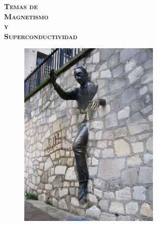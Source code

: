 \documentclass[
11pt, %
spanish,
singlespacing, %
parskip, %
headsepline, %
]{MastersDoctoralThesis} %
\author{Dr. José Ruzzante} %
\begin{document}

\pagestyle{empty}

\begin{center}


\vspace{10cm}

{\fontsize{20}{24}\selectfont \textsc{\bfseries Temas de}} 
\vspace{2.0cm} \\ 
{\fontsize{35}{37}\selectfont \textsc{\bfseries Magnetismo }}
\vspace{30px} \\ 
{\fontsize{37}{37}\selectfont \textsc{\bfseries y }}
\vspace{30px}\\ 
{\fontsize{35}{37}\selectfont \textsc{\bfseries Superconductividad }}


\vspace{0.5cm}




\begin{figure}[H]
    \centering
    \includegraphics[width=0.60\textwidth]{./Figures/tapaLibro}
 \end{figure}


\end{center}
\end{document}
